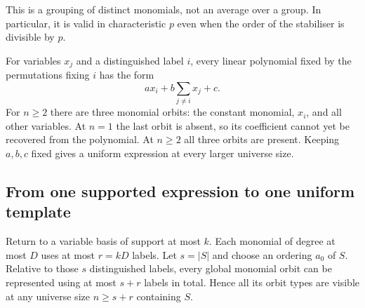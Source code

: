 This is a grouping of distinct monomials, not an average over a group.
In particular, it is valid in characteristic $p$ even when the order
of the stabiliser is divisible by $p$.

\begin{example}\label{tx:eg:supported-linear}
For variables $x_j$ and a distinguished label $i$, every linear
polynomial fixed by the permutations fixing $i$ has the form
\[
                    a x_i+b\sum_{j\ne i}x_j+c.
\]
For $n\ge2$ there are three monomial orbits: the constant monomial, $x_i$, and all
other variables. At $n=1$ the last orbit is absent, so its coefficient
cannot yet be recovered from the polynomial. At $n\ge2$ all three
orbits are present. Keeping $a,b,c$ fixed gives a uniform expression
at every larger universe size.
\end{example}

\subsection{From one supported expression to one uniform template}
Return to a variable basis of support at most $k$. Each monomial of
degree at most $D$ uses at most $r=kD$ labels. Let $s=|S|$ and choose
an ordering $a_0$ of $S$. Relative to those $s$ distinguished labels,
every global monomial orbit can be represented using at most $s+r$
labels in total. Hence all its orbit types are visible at any universe size
$n\ge s+r$ containing $S$.

